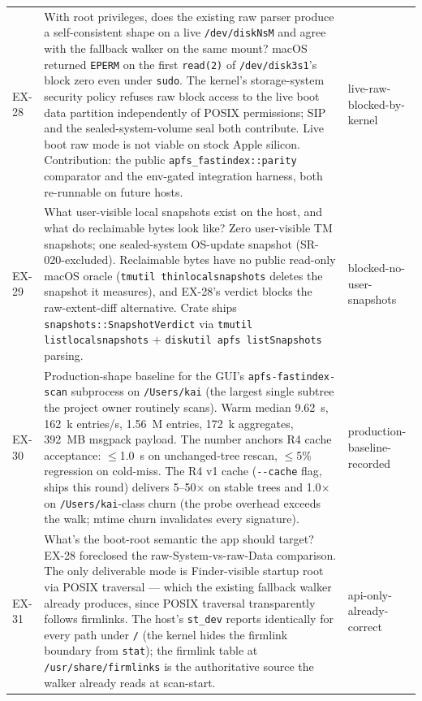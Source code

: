 \begin{longtable}{p{}p{}p{}}
EX-28 &
With root privileges, does the existing raw parser produce a
self-consistent shape on a live \texttt{/dev/diskNsM} and
agree with the fallback walker on the same mount? macOS
returned \texttt{EPERM} on the first \texttt{read(2)} of
\texttt{/dev/disk3s1}'s block zero even under \texttt{sudo}.
The kernel's storage-system security policy refuses raw block
access to the live boot data partition independently of POSIX
permissions; SIP and the sealed-system-volume seal both
contribute. Live boot raw mode is not viable on stock Apple
silicon. Contribution: the public
\texttt{apfs\_fastindex::parity} comparator and the env-gated
integration harness, both re-runnable on future hosts.
& live-raw-blocked-by-kernel \\

EX-29 &
What user-visible local snapshots exist on the host, and what
do reclaimable bytes look like? Zero user-visible TM
snapshots; one sealed-system OS-update snapshot
(SR-020-excluded). Reclaimable bytes have no public
read-only macOS oracle (\texttt{tmutil thinlocalsnapshots}
deletes the snapshot it measures), and EX-28's verdict
blocks the raw-extent-diff alternative. Crate ships
\texttt{snapshots::SnapshotVerdict} via
\texttt{tmutil listlocalsnapshots} +
\texttt{diskutil apfs listSnapshots} parsing.
& blocked-no-user-snapshots \\

EX-30 &
Production-shape baseline for the GUI's
\texttt{apfs-fastindex-scan} subprocess on
\texttt{/Users/kai} (the largest single subtree the project
owner routinely scans). Warm median 9.62~s, 162~k entries/s,
1.56~M entries, 172~k aggregates, 392~MB msgpack payload.
The number anchors R4 cache acceptance:
$\leq$1.0~s on unchanged-tree rescan, $\leq$5\% regression on
cold-miss. The R4 v1 cache (\texttt{-{}-cache} flag, ships
this round) delivers 5--50$\times$ on stable trees and
1.0$\times$ on \texttt{/Users/kai}-class churn (the probe
overhead exceeds the walk; mtime churn invalidates every
signature).
& production-baseline-recorded \\

EX-31 &
What's the boot-root semantic the app should target? EX-28
foreclosed the raw-System-vs-raw-Data comparison. The only
deliverable mode is Finder-visible startup root via POSIX
traversal --- which the existing fallback walker already
produces, since POSIX traversal transparently follows
firmlinks. The host's \texttt{st\_dev} reports identically
for every path under \texttt{/} (the kernel hides the
firmlink boundary from \texttt{stat}); the firmlink table at
\texttt{/usr/share/firmlinks} is the authoritative source the
walker already reads at scan-start.
& api-only-already-correct \\


\end{longtable}
